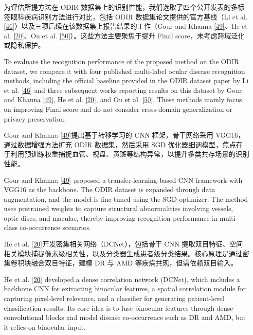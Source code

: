 
为评估所提方法在 ODIR 数据集上的识别性能，我们选取了四个公开发表的多标签眼科疾病识别方法进行对比，包括 ODIR 数据集论文提供的官方基线（Li et al. \hyperref[_Ref213949402]{{[}46{]}}）以及三项后续在该数据集上报告结果的工作（Gour and Khanna \hyperref[_Ref214903299]{{[}49{]}}、He et al. \hyperref[_Ref213950338]{{[}20{]}}、Ou et al. \hyperref[_Ref214903327]{{[}50{]}}）。这些方法主要聚焦于提升 Final score，未考虑跨域泛化或隐私保护。

To evaluate the recognition performance of the proposed method on the ODIR dataset, we compare it with four published multi-label ocular disease recognition methods, including the official baseline provided in the ODIR dataset paper by Li et al. \hyperref[_Ref213949402]{{[}46{]}} and three subsequent works reporting results on this dataset by Gour and Khanna \hyperref[_Ref214903299]{{[}49{]}}, He et al. \hyperref[_Ref213950338]{{[}20{]}}, and Ou et al. \hyperref[_Ref214903327]{{[}50{]}}. These methods mainly focus on improving Final score and do not consider cross-domain generalization or privacy preservation.

Gour and Khanna \hyperref[_Ref214903299]{{[}49{]}}提出基于转移学习的 CNN 框架，骨干网络采用 VGG16，通过数据增强方法扩充 ODIR 数据集，然后采用 SGD 优化器细调模型，焦点在于利用预训练权重捕捉血管、视盘、黄斑等结构异常，以提升多类共存场景的识别性能。

Gour and Khanna \hyperref[_Ref214903299]{{[}49{]}} proposed a transfer-learning-based CNN framework with VGG16 as the backbone. The ODIR dataset is expanded through data augmentation, and the model is fine-tuned using the SGD optimizer. The method uses pretrained weights to capture structural abnormalities involving vessels, optic discs, and maculae, thereby improving recognition performance in multi-class co-occurrence scenarios.

He et al. \hyperref[_Ref213950338]{{[}20{]}}开发密集相关网络（DCNet），包括骨干 CNN 提取双目特征、空间相关模块捕捉像素级相关性，以及分类器生成患者级分类结果。核心原理是通过密集卷积块融合双目特征，建模 DR 与 AMD 等疾病共现，但需依赖双目输入。

He et al. \hyperref[_Ref213950338]{{[}20{]}} developed a dense correlation network (DCNet), which includes a backbone CNN for extracting binocular features, a spatial correlation module for capturing pixel-level relevance, and a classifier for generating patient-level classification results. Its core idea is to fuse binocular features through dense convolutional blocks and model disease co-occurrence such as DR and AMD, but it relies on binocular input.

